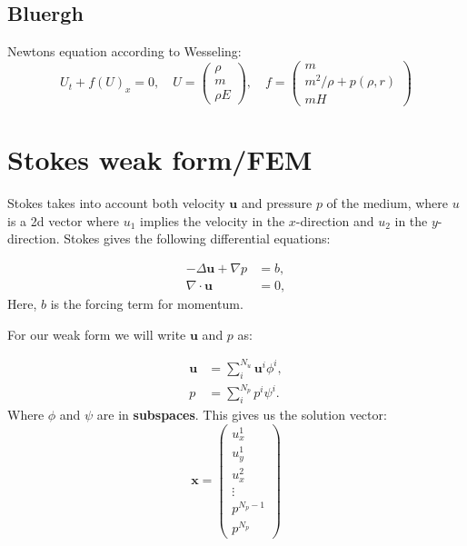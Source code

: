 \documentclass{article}
\begin{document}
\subsection*{Bluergh}
Newtons equation according to Wesseling:
\begin{equation}
U_t +f(U)_x=0, \quad U=\begin{pmatrix}\rho \\ m \\ \rho E \end{pmatrix}, \quad f = \begin{pmatrix}
m \\ m^2/\rho+p(\rho,r) \\ mH
\end{pmatrix}
\end{equation}

\newpage
\section{Stokes weak form/FEM}
Stokes takes into account both velocity $\mathbf{u}$ and pressure $p$ of the medium, where $u$ is a 2d vector where $u_1$ implies the velocity in the $x$-direction and $u_2$ in the $y$-direction. Stokes gives the following differential equations:

\begin{eqnarray}
    -\Delta \mathbf{u}+\nabla p &= b, \label{eq:stokes_momentum_strong} \\
    \nabla \cdot \mathbf{u} &= 0 \label{eq:stokes_pressure_strong},
\end{eqnarray}
Here, $b$ is the forcing term for momentum. 

For our weak form we will write $\mathbf{u}$ and $p$ as:

\begin{eqnarray}
    \mathbf{u} &= \sum_i^{N_u} \mathbf{u}^i \phi^i, \label{eq:stokes_expansion_momentum_u}\\
            p  &= \sum_i^{N_p}         p ^i \psi^i. \label{eq:stokes_expansion_pressure_p}
\end{eqnarray}
Where ${\phi}$ and $\psi$ are in \textbf{subspaces}. This gives us the solution vector:
\begin{equation}
    \mathbf{x} = \begin{pmatrix}
        u_x^1 \\ u_y^1 \\ u_x^2 \\ \vdots \\ p^{N_p-1} \\ p^{N_p}
    \end{pmatrix}
\end{equation}
\end{document}
